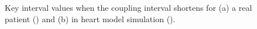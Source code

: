 \begin{figure}[!t]
\centering
\label{fig:Case_1}
\caption{\small Key interval values when the coupling interval shortens for (a) a real patient (\cite{josephson}) and (b) in heart model simulation (\cite{vhm_ecrts10}).}
\end{figure} 


